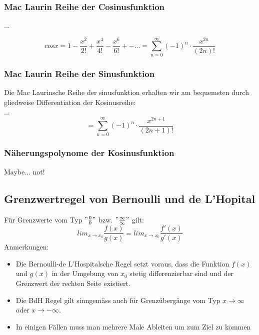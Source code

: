 \subsubsection*{Mac Laurin Reihe der Cosinusfunktion}
...
\begin{formel}
$$cos x = 1 - \frac{x^2}{2!} + \frac{x^4}{4!} - \frac{x^6}{6!} +- ... =  \sum\limits_{n=0}^{\infty}(-1)^n \cdot \frac{x^{2n}}{(2n)!}$$
\end{formel}

\subsubsection*{Mac Laurin Reihe der Sinusfunktion}
Die Mac Laurinsche Reihe der sinusfunktion erhalten wir am bequemsten durch gliedweise Differentiation der Kosinusreihe:
\\...\\
$$ = \sum\limits_{n=0}^{\infty} (-1)^n \cdot \frac{x^{2n+1}}{(2n+1)!}$$

\subsubsection*{Näherungspolynome der Kosinusfunktion}
Maybe... not!

\subsection{Grenzwertregel von Bernoulli und de L'Hopital}
\begin{definition}
Für Grenzwerte vom Typ $"\frac{0}{0}"$ bzw. $"\frac{\infty}{\infty}"$ gilt:
$$lim_{x \rightarrow x_0} \frac{f(x)}{g(x)} = lim_{x \rightarrow x_0} \frac{f'(x)}{g'(x)}$$
Anmerkungen:
\begin{itemize}
	\item Die Bernoulli-de L'Hospitalsche Regel setzt voraus, dass die Funktion $f(x)$ und $g(x)$ in der Umgebung von $x_0$ stetig differenzierbar sind und der Grenzwert der rechten Seite existiert.
	\item Die BdH Regel gilt sinngemäss auch für Grenzübergänge vom Typ $x \rightarrow \infty$ oder $x \rightarrow -\infty$.
	\item In einigen Fällen muss man mehrere Male Ableiten um zum Ziel zu kommen
\end{itemize}
\end{definition}

